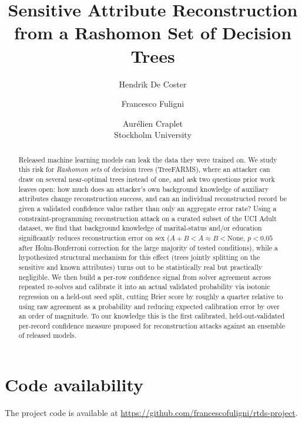 \documentclass[11pt]{article}
\title{Sensitive Attribute Reconstruction from a Rashomon Set of Decision Trees}
\author{Hendrik De Coster \and Francesco Fuligni \and Aur\'elien Craplet \\ Stockholm University}
\date{}
\begin{document}
\maketitle

\begin{abstract}
Released machine learning models can leak the data they were trained on. We study this risk for \emph{Rashomon sets} of decision trees (TreeFARMS), where an attacker can draw on several near-optimal trees instead of one, and ask two questions prior work leaves open: how much does an attacker's own background knowledge of auxiliary attributes change reconstruction success, and can an individual reconstructed record be given a validated confidence value rather than only an aggregate error rate? Using a constraint-programming reconstruction attack on a curated subset of the UCI Adult dataset, we find that background knowledge of marital-status and/or education significantly reduces reconstruction error on sex ($A{+}B < A \approx B < \text{None}$, $p<0.05$ after Holm-Bonferroni correction for the large majority of tested conditions), while a hypothesized structural mechanism for this effect (trees jointly splitting on the sensitive and known attributes) turns out to be statistically real but practically negligible. We then build a per-row confidence signal from solver agreement across repeated re-solves and calibrate it into an actual validated probability via isotonic regression on a held-out seed split, cutting Brier score by roughly a quarter relative to using raw agreement as a probability and reducing expected calibration error by over an order of magnitude. To our knowledge this is the first calibrated, held-out-validated per-record confidence measure proposed for reconstruction attacks against an ensemble of released models.
\end{abstract}






\section*{Code availability}
The project code is available at \url{https://github.com/francescofuligni/rtds-project}.


\end{document}
